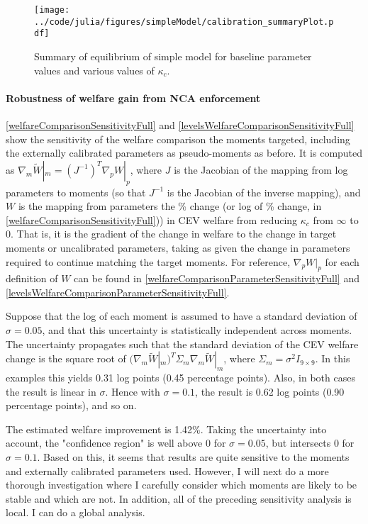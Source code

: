 \documentclass[11pt,english]{article}
\theoremstyle{remark}
\begin{document}
\begin{figure}[]
	\texttt{[image: ../code/julia/figures/simpleModel/calibration\_summaryPlot.pdf]}
	\caption{Summary of equilibrium of simple model for baseline parameter values and various values of $\kappa_c$.}
	\label{calibration_summaryPlot}
\end{figure}




\paragraph{Robustness of welfare gain from NCA enforcement}

\autoref{welfareComparisonSensitivityFull} and \autoref{levelsWelfareComparisonSensitivityFull} show the sensitivity of the welfare comparison the moments targeted, including the externally calibrated parameters as pseudo-moments as before. It is computed as $\nabla_m \tilde{W}|_m = (J^{-1})^T \nabla_p W|_p$, where $J$ is the Jacobian of the mapping from log parameters to moments (so that $J^{-1}$ is the Jacobian of the inverse mapping), and $W$ is the mapping from parameters the \% change (or log of \% change, in \autoref{welfareComparisonSensitivityFull})) in CEV welfare from reducing $\kappa_c$ from $\infty$ to $0$. That is, it is the gradient of the change in welfare to the change in target moments or uncalibrated parameters, taking as given the change in parameters required to continue matching the target moments. For reference, $\nabla_p W|_p$  for each definition of $W$ can be found in \autoref{welfareComparisonParameterSensitivityFull} and \autoref{levelsWelfareComparisonParameterSensitivityFull}.

Suppose that the log of each moment is assumed to have a standard deviation of $\sigma = 0.05$, and that this uncertainty is statistically independent across moments. The uncertainty propagates such that the standard deviation of the CEV welfare change is the square root of $(\nabla_m \tilde{W}|_m)^T \Sigma_m \nabla_m \tilde{W}|_m$, where $\Sigma_m = \sigma^2 I_{9\times 9}$. In this examples this yields 0.31 log points (0.45 percentage points). Also, in both cases the result is linear in $\sigma$. Hence with $\sigma = 0.1$, the result is 0.62 log points (0.90 percentage points), and so on.

The estimated welfare improvement is 1.42\%. Taking the uncertainty into account, the "confidence region" is well above 0 for $\sigma = 0.05$, but intersects 0 for $\sigma = 0.1$. Based on this, it seems that results are quite sensitive to the moments and externally calibrated parameters used. However, I will next do a more thorough investigation where I carefully consider which moments are likely to be stable and which are not. In addition, all of the preceding sensitivity analysis is local. I can do a global analysis.
\end{document}
